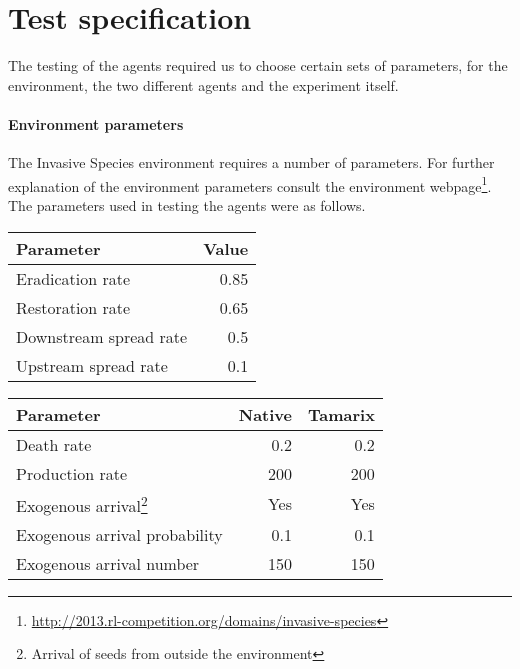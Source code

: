 \section{Test specification}
\label{sec:test_spec}

The testing of the agents required us to choose certain sets of parameters, for
the environment, the two different agents and the experiment itself. 

\paragraph{Environment parameters}

The Invasive Species environment requires a number of parameters. For further
explanation of the environment parameters consult the environment
webpage\footnote{\url{http://2013.rl-competition.org/domains/invasive-species}}.
The parameters used in testing the agents were as follows.

\begin{table}[H]
\centering
{}
\label{tab:dynamic_params_common} 
\begin{tabular}{l r}
 \toprule
 Parameter & Value \\
 \midrule
 Eradication rate & 0.85 \\
 Restoration rate & 0.65 \\
 Downstream spread rate & 0.5 \\
 Upstream spread rate & 0.1 \\
 \bottomrule
\end{tabular}
\end{table}

\begin{table}[H]
\centering
{} \label{tab:dynamic_params_not_common}
\begin{tabular}{lrr}
\toprule
 Parameter & Native & Tamarix \\
 \midrule
 Death rate & 0.2 & 0.2 \\
 Production rate & 200 & 200 \\
 Exogenous arrival\footnote{Arrival of seeds from outside the environment} & Yes & Yes \\
 Exogenous arrival probability & 0.1 & 0.1 \\
 Exogenous arrival number & 150 & 150 \\
 \bottomrule
\end{tabular}
\end{table}


